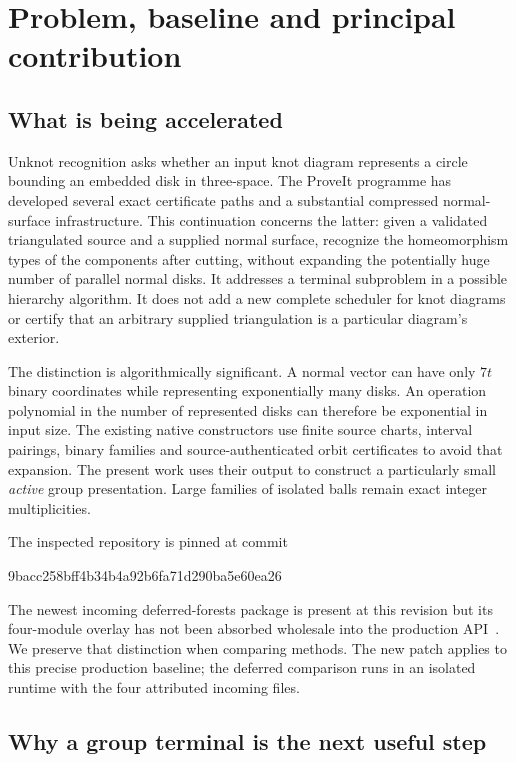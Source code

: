 \section{Problem, baseline and principal contribution}
\label{sec:scope}

\subsection{What is being accelerated}

Unknot recognition asks whether an input knot diagram represents a circle
bounding an embedded disk in three-space. The ProveIt programme has developed
several exact certificate paths and a substantial compressed normal-surface
infrastructure. This continuation concerns the latter: given a validated
triangulated source and a supplied normal surface, recognize the homeomorphism
types of the components after cutting, without expanding the potentially huge
number of parallel normal disks. It addresses a terminal subproblem in a
possible hierarchy algorithm. It does not add a new complete scheduler for knot
diagrams or certify that an arbitrary supplied triangulation is a particular
diagram's exterior.

The distinction is algorithmically significant. A normal vector can have only
$7t$ binary coordinates while representing exponentially many disks. An
operation polynomial in the number of represented disks can therefore be
exponential in input size. The existing native constructors use finite source
charts, interval pairings, binary families and source-authenticated orbit
certificates to avoid that expansion. The present work uses their output to
construct a particularly small \emph{active} group presentation. Large families
of isolated balls remain exact integer multiplicities.

The inspected repository is pinned at commit~\cite{RepoSnapshot}
\begin{center}\small\ttfamily
9bacc258bff4b34b4a92b6fa71d290ba5e60ea26
\end{center}
The newest incoming deferred-forests package is present at this revision but
its four-module overlay has not been absorbed wholesale into the production
API~\cite{DeferredForests}. We preserve that distinction when comparing methods.
The new patch applies to this precise production baseline; the deferred
comparison runs in an isolated runtime with the four attributed incoming files.

\subsection{Why a group terminal is the next useful step}

